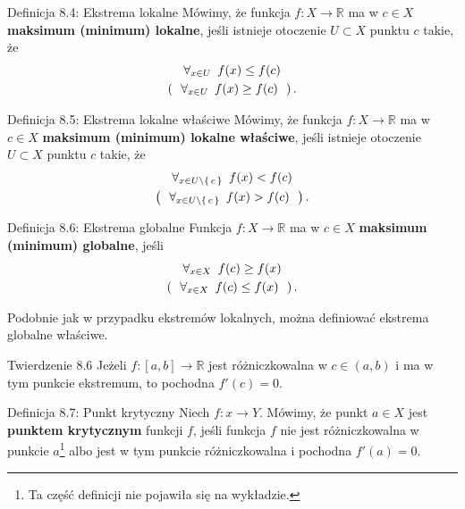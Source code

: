 \documentclass{article}
\newcommand{\hquad}{\mkern9mu}
\newcommand{\R}{\mathbb{R}}
\begin{document}
\begin{defr}{Definicja 8.4: Ekstrema lokalne}
    Mówimy, że funkcja $f:X\to\R$ ma w $c\in X$ \textbf{maksimum (minimum) lokalne}, jeśli istnieje otoczenie $U\subset X$
    punktu $c$ takie, że 
    \begin{gather*}
        \forall_{x\in U}\hquad f(x)\le f(c)\\
        \left(\ \ \forall_{x\in U}\hquad f(x)\ge f(c)\ \ \right).
    \end{gather*}
\end{defr}

\begin{defr}{Definicja 8.5: Ekstrema lokalne właściwe}
    Mówimy, że funkcja $f:X\to\R$ ma w $c\in X$ \textbf{maksimum (minimum) lokalne właściwe}, jeśli istnieje otoczenie $U\subset X$
    punktu $c$ takie, że 
    \begin{gather*}
        \forall_{x\in U\setminus\set{c}}\hquad f(x)< f(c)\\
        \left(\ \ \forall_{x\in U\setminus\set{c}}\hquad f(x)> f(c)\ \ \right).
    \end{gather*}
\end{defr}

\begin{defr}{Definicja 8.6: Ekstrema globalne}
    Funkcja $f:X\to\R$ ma w $c\in X$ \textbf{maksimum (minimum) globalne}, jeśli
    \begin{gather*}
        \forall_{x\in X}\hquad f(c)\ge f(x)\\
        \left(\ \ \forall_{x\in X}\hquad f(c)\le f(x)\ \ \right).
    \end{gather*}
\end{defr}

Podobnie jak w przypadku ekstremów lokalnych, można definiować ekstrema globalne właściwe.

\begin{twier}{Twierdzenie 8.6}
    Jeżeli $f:[a,b]\to\R$ jest różniczkowalna w $c\in(a,b)$ i ma w tym punkcie ekstremum, to pochodna $f'(c)=0$.
\end{twier}

\begin{defr}{Definicja 8.7: Punkt krytyczny}
    Niech $f:x\to Y$. Mówimy, że punkt $a\in X$ jest \textbf{punktem krytycznym} funkcji $f$, jeśli funkcja $f$ nie jest różniczkowalna w punkcie $a$\footnote{Ta część definicji nie pojawiła się na wykładzie.} albo jest w tym punkcie różniczkowalna i pochodna $f'(a)=0$.
\end{defr}
\end{document}
